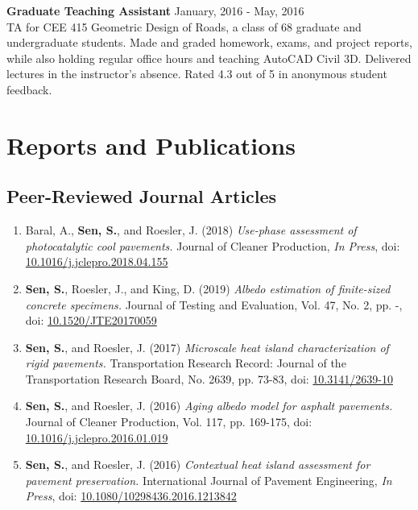 \documentclass[12pt]{article}
\begin{document}
\textbf{Graduate Teaching Assistant} \hfill January, 2016 - May, 2016 \\
TA for CEE 415 Geometric Design of Roads, a class of 68 graduate and undergraduate students. Made and graded homework, exams, and project reports, while also holding regular office hours and teaching AutoCAD Civil 3D. Delivered lectures in the instructor's absence. Rated 4.3 out of 5 in anonymous student feedback. \\

\section*{Reports and Publications}
\subsection*{Peer-Reviewed Journal Articles}
\begin{enumerate}[label=(J\arabic*)]
	\item Baral, A., \textbf{Sen, S.}, and Roesler, J. (2018) \textit{Use-phase assessment of photocatalytic cool pavements.}  Journal of Cleaner Production, \textit{In Press}, doi: \href{https://doi.org/10.1016/j.jclepro.2018.04.155}{10.1016/j.jclepro.2018.04.155}
	\item \textbf{Sen, S.}, Roesler, J., and King, D. (2019) \textit{Albedo estimation of finite-sized concrete specimens.} Journal of Testing and Evaluation, Vol. 47, No. 2, pp. -, doi: \href{https://doi.org/10.1520/JTE20170059}{10.1520/JTE20170059}
	\item \textbf{Sen, S.}, and Roesler, J. (2017) \textit{Microscale heat island characterization of rigid pavements.} Transportation Research Record: Journal of the Transportation Research Board, No. 2639, pp. 73-83, doi: \href{http://dx.doi.org/10.3141/2639-10}{10.3141/2639-10}
	\item \textbf{Sen, S.}, and Roesler, J. (2016) \textit{Aging albedo model for asphalt pavements.} Journal of Cleaner Production, Vol. 117, pp. 169-175, doi: \href{http://dx.doi.org/10.1016/j.jclepro.2016.01.019}{10.1016/j.jclepro.2016.01.019}
	\item \textbf{Sen, S.}, and Roesler, J. (2016) \textit{Contextual heat island assessment for pavement preservation.} International Journal of Pavement Engineering, \textit{In Press}, doi: \href{http://www.tandfonline.com/doi/full/10.1080/10298436.2016.1213842}{10.1080/10298436.2016.1213842}
\end{enumerate}
\end{document}
